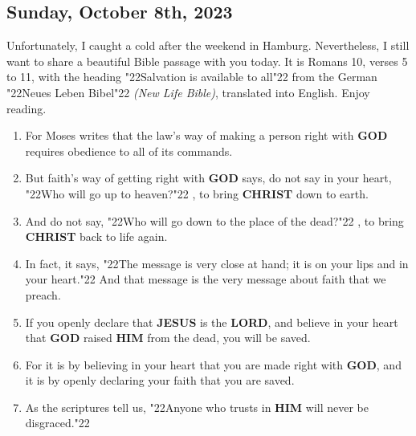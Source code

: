 \documentclass[12pt,a4paper]{article}
\newcommand{\Christ}[0]{\textbf{CHRIST}}
\newcommand{\God}[0]{\textbf{GOD}}
\newcommand{\Him}[0]{\textbf{HIM}}
\newcommand{\Jesus}[0]{\textbf{JESUS}}
\newcommand{\Lord}[0]{\textbf{LORD}}
\newcommand{\q}[1]{\char"22{#1}\char"22 }
\begin{document}
	\subsection{Sunday, October 8th, 2023}
		Unfortunately,
		I caught a cold after the weekend in Hamburg.
		Nevertheless,
		I still want to share a beautiful Bible passage with you today.
		It is Romans 10,
		verses 5 to 11,
		with the heading
		\q{Salvation is available to all}
		from the German \q{Neues Leben Bibel} \textit{(New Life Bible)},
		translated into English.
		Enjoy reading.
		\begin{enumerate}[nosep,start=5]
			\item	For Moses writes that the law’s way of making a person right with {\God} requires obedience to all of its commands.
			\item	But faith’s way of getting right with {\God} says,
					do not say in your heart,
					\q{Who will go up to heaven?},
					to bring {\Christ} down to earth.
			\item	And do not say,
					\q{Who will go down to the place of the dead?},
					to bring {\Christ} back to life again.
			\item	In fact,
					it says,
					\q{The message is very close at hand;
					it is on your lips and in your heart.}
					And that message is the very message about faith that we preach.
			\item	If you openly declare that {\Jesus} is the {\Lord},
					and believe in your heart that {\God} raised {\Him} from the dead,
					you will be saved.
			\item	For it is by believing in your heart that you are made right with {\God},
					and it is by openly declaring your faith that you are saved.
			\item	As the scriptures tell us,
					\q{Anyone who trusts in {\Him} will never be disgraced.}
		\end{enumerate}

	\newpage
\end{document}
